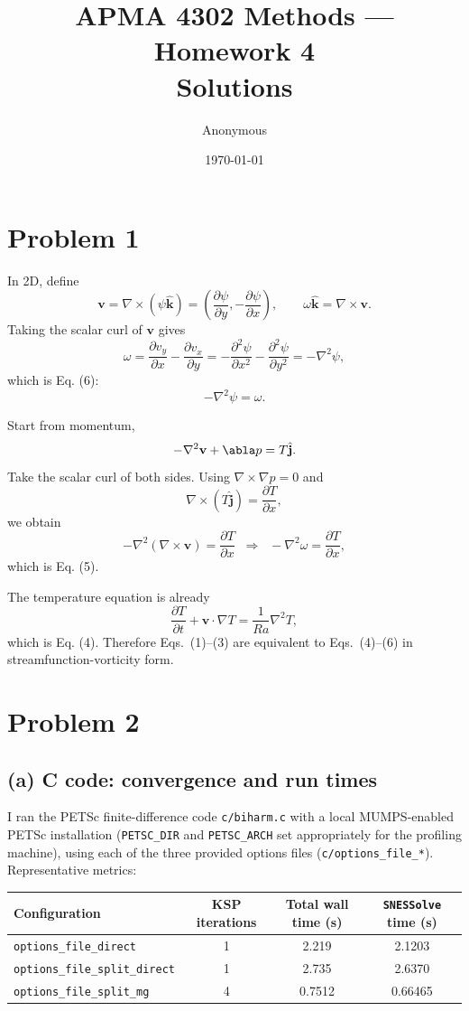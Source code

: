\documentclass[11pt]{article}
\title{APMA 4302 Methods --- Homework 4 \\ Solutions}
\author{Anonymous}
\date{\today}
\begin{document}
\maketitle

\section*{Problem 1}
In 2D, define
\[
\mathbf{v} = \nabla \times (\psi \hat{\mathbf{k}})
= \left(\frac{\partial \psi}{\partial y}, -\frac{\partial \psi}{\partial x}\right),
\qquad
\omega \hat{\mathbf{k}} = \nabla \times \mathbf{v}.
\]
Taking the scalar curl of $\mathbf{v}$ gives
\[
\omega = \frac{\partial v_y}{\partial x} - \frac{\partial v_x}{\partial y}
= -\frac{\partial^2 \psi}{\partial x^2} - \frac{\partial^2 \psi}{\partial y^2}
= -\nabla^2 \psi,
\]
which is Eq. (6):
\[
-\nabla^2 \psi = \omega.
\]

Start from momentum,
\[
-\nabla^2 \mathbf{v} + \abla p = T \hat{\mathbf{j}}.
\]
Take the scalar curl of both sides. Using $\nabla \times \nabla p = 0$ and
\[
\nabla \times (T\hat{\mathbf{j}}) = \frac{\partial T}{\partial x},
\]
we obtain
\[
-\nabla^2 (\nabla \times \mathbf{v}) = \frac{\partial T}{\partial x}
\;\;\Longrightarrow\;\;
-\nabla^2 \omega = \frac{\partial T}{\partial x},
\]
which is Eq. (5).

The temperature equation is already
\[
\frac{\partial T}{\partial t} + \mathbf{v}\cdot \nabla T
= \frac{1}{Ra}\nabla^2 T,
\]
which is Eq. (4). Therefore Eqs.~(1)--(3) are equivalent to Eqs.~(4)--(6) in streamfunction-vorticity form.

\section*{Problem 2}
\subsection*{(a) C code: convergence and run times}
I ran the PETSc finite-difference code \texttt{c/biharm.c} with a local MUMPS-enabled PETSc installation (\texttt{PETSC\_DIR} and \texttt{PETSC\_ARCH} set appropriately for the profiling machine), using each of the three provided options files (\texttt{c/options\_file\_*}). Representative metrics:

\begin{center}
\begin{tabular}{lccc}
\toprule
Configuration & KSP iterations & Total wall time (s) & \texttt{SNESSolve} time (s) \\
\midrule
\texttt{options\_file\_direct} & 1 & 2.219 & 2.1203 \\
\texttt{options\_file\_split\_direct} & 1 & 2.735 & 2.6370 \\
\texttt{options\_file\_split\_mg} & 4 & 0.7512 & 0.66465 \\
\bottomrule
\end{tabular}
\end{center}
\end{document}
